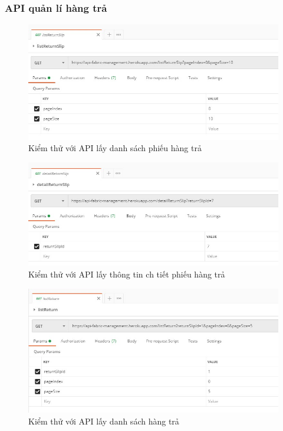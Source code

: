 \subsubsection{API quản lí hàng trả}
\begin{figure}[H]
    \begin{center}
        \includegraphics[width=12cm]{Image/API/30_listReturnSlip.jpg}
        \caption{Kiểm thử với API lấy danh sách phiếu hàng trả}
        \label{listReturnSlip}
    \end{center}
\end{figure}
\begin{figure}[H]
    \begin{center}
        \includegraphics[width=12cm]{Image/API/31_detailReturnSlip.jpg}
        \caption{Kiểm thử với API lấy thông tin ch tiết phiếu hàng trả}
        \label{detailReturnSlip}
    \end{center}
\end{figure}
\begin{figure}[H]
    \begin{center}
        \includegraphics[width=12cm]{Image/API/32_listReturn.jpg}
        \caption{Kiểm thử với API lấy danh sách hàng trả}
        \label{listReturn}
    \end{center}
\end{figure}
